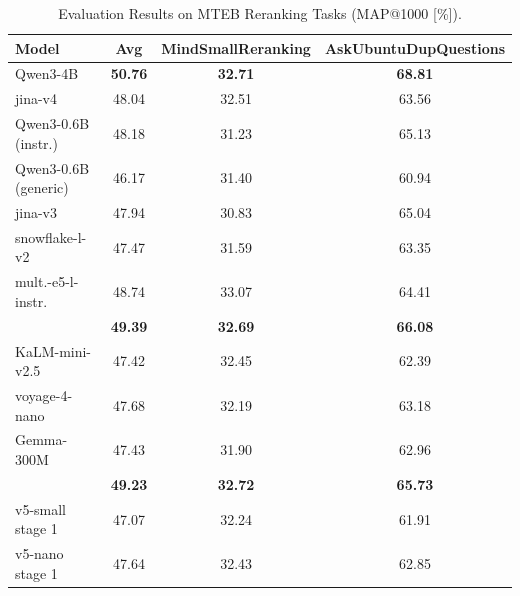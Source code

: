 \documentclass[11pt]{article}
\begin{document}
\begin{table}[H]
\caption{Evaluation Results on MTEB Reranking Tasks (MAP@1000 [\%]).}
\label{tab:reranking_en_results}
\centering
\small
\setlength{\tabcolsep}{4pt}
\begin{tabular}{l*{3}{c}}
\toprule
\textbf{Model} & \textbf{Avg} & \textbf{MindSmallReranking} & \textbf{AskUbuntuDupQuestions} \\
\midrule
Qwen3-4B & \textbf{50.76} & \textbf{32.71} & \textbf{68.81} \\
jina-v4 & 48.04 & 32.51 & 63.56 \\
\midrule
Qwen3-0.6B (instr.) & 48.18 & 31.23 & 65.13 \\
Qwen3-0.6B (generic) & 46.17 & 31.40 & 60.94 \\
jina-v3 & 47.94 & 30.83 & 65.04 \\
snowflake-l-v2 & 47.47 & 31.59 & 63.35 \\
mult.-e5-l-instr. & 48.74 & 33.07 & 64.41 \\
\JEmbeddingVFiveTextSmallShort{} & \textbf{49.39} & \textbf{32.69} & \textbf{66.08} \\
\midrule
KaLM-mini-v2.5 & 47.42 & 32.45 & 62.39 \\
voyage-4-nano & 47.68 & 32.19 & 63.18 \\
Gemma-300M & 47.43 & 31.90 & 62.96 \\
\JEmbeddingVFiveTextNanoShort{} & \textbf{49.23} & \textbf{32.72} & \textbf{65.73} \\
\midrule
v5-small stage 1 & 47.07 & 32.24 & 61.91 \\
v5-nano stage 1 & 47.64 & 32.43 & 62.85 \\
\bottomrule
\end{tabular}
\end{table}
\end{document}

